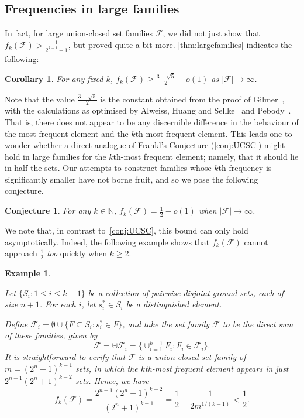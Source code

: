 \documentclass[a4paper,12pt]{article}
\theoremstyle{mystyle}	%
\newtheorem{example}[theorem]{Example}
\newtheorem{corollary}[theorem]{Corollary}
\newtheorem{conjecture}[theorem]{Conjecture}
\theoremstyle{definition}
\newcommand{\N}{\mathbb{N}}
\newcommand{\F}{\mathcal{F}}
\newcommand{\6}{\partial}
\begin{document}
\subsection{Frequencies in large families}

In fact, for large union-closed set families $\F$, we did not just show that $f_k(\F) > \frac{1}{2^{k-1} + 1}$, but proved quite a bit more. \cref{thm:largefamilies} indicates the following:

\begin{corollary}\label{cor:large}
    For any fixed $k$, $f_k(\mathcal{F})\geq \frac{3-\sqrt{5}}{2}-o(1)$ as $|\mathcal{F}|\to\infty$.
\end{corollary}

Note that the value $\frac{3 - \sqrt{5}}{2}$ is the constant obtained from the proof of Gilmer~\cite{gilmer2022constant}, with the calculations as optimised by Alweiss, Huang and Sellke~\cite{alweiss2022improved} and Pebody~\cite{pebody2022extension}. That is, there does not appear to be any discernible difference in the behaviour of the most frequent element and the $k$th-most frequent element. This leads one to wonder whether a direct analogue of Frankl's Conjecture (\cref{conj:UCSC}) might hold in large families for the $k$th-most frequent element; namely, that it should lie in half the sets. Our attempts to construct families whose $k$th frequency is significantly smaller have not borne fruit, and so we pose the following conjecture.

\begin{conjecture}\label{conj:Fkhalf}
    For any $k\in \N$, $f_k(\mathcal{F})=\frac12-o(1)$ when $|\mathcal{F}|\to \infty$.
\end{conjecture}

We note that, in contrast to~\cref{conj:UCSC}, this bound can only hold asymptotically. Indeed, the following example shows that $f_k(\F)$ cannot approach $\frac12$ \emph{too} quickly when $k \ge 2$.

\begin{example}\label{example:notconstant}

Let $\{S_i : 1 \le i \le k-1\}$ be a collection of pairwise-disjoint ground sets, each of size $n+1$. For each $i$, let $s_i^* \in S_i$ be a distinguished element.

Define $\F_i = \emptyset \cup \{ F \subseteq S_i : s_i^* \in F \}$, and take the set family $\F$ to be the \emph{direct sum} of these families, given by
\[ \F = \uplus \F_i = \{ \cup_{i = 1}^{k-1} F_i : F_i \in \F_i \}. \]
It is straightforward to verify that $\F$ is a union-closed set family of $m = (2^n+1)^{k-1}$ sets, in which the $k$th-most frequent element appears in just $2^{n-1} (2^n + 1)^{k-2}$ sets. Hence, we have
\[ f_k(\F) = \frac{2^{n-1}(2^n + 1)^{k-2}}{(2^n + 1)^{k-1}} = \frac12 - \frac{1}{2 m^{1/(k-1)}} < \frac12. \]
\end{example}
\end{document}
